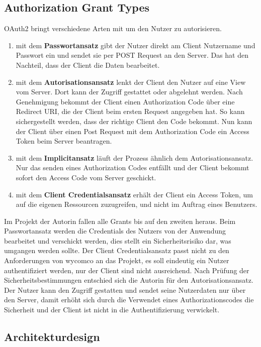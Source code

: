 \subsection{Authorization Grant Types}
\label{sec:AuthorizationGrants}

OAuth2 bringt verschiedene Arten mit um den Nutzer zu autorisieren.

\begin{enumerate}
\item mit dem \textbf{Passwortansatz} gibt der Nutzer direkt am Client Nutzername und Passwort ein und sendet sie per POST Request an den Server. Das hat den Nachteil, dass der Client die Daten bearbeitet.
\item mit dem \textbf{Autorisationsansatz} lenkt der Client den Nutzer auf eine View vom Server. Dort kann der Zugriff gestattet oder abgelehnt werden. Nach Genehmigung bekommt der Client einen Authorization Code über eine Redirect URI, die der Client beim ersten Request angegeben hat. So kann sichergestellt werden, dass der richtige Client den Code bekommt. Nun kann der Client über einen Post Request mit dem Authorization Code ein Access Token beim Server beantragen. 
\item mit dem \textbf{Implicitansatz} läuft der Prozess ähnlich dem Autorisationsansatz. Nur das senden eines Authorization Codes entfällt und der Client bekommt sofort den Access Code vom Server geschickt.
\item mit dem \textbf{Client Credentialsansatz} erhält der Client ein Access Token, um auf die eigenen Ressourcen zuzugreifen, und nicht im Auftrag eines Benutzers.
\end{enumerate}

Im Projekt der Autorin fallen alle Grants bis auf den zweiten heraus. Beim Passwortansatz werden die Credentials des Nutzers von der Anwendung bearbeitet und verschickt werden, dies stellt ein Sicherheitsrisiko dar, was umgangen werden sollte.
Der Client Credentialsansatz passt nicht zu den Anforderungen von wycomco an das Projekt, es soll eindeutig ein Nutzer authentifiziert werden, nur der Client sind nicht ausreichend. Nach Prüfung der Sicherheitsbestimmungen entschied sich die Autorin für den Autorisationsansatz. Der Nutzer kann den Zugriff gestatten und sendet seine Nutzerdaten nur über den Server, damit erhöht sich durch die Verwendet eines Authorizationscodes die Sicherheit und der Client ist nicht in die Authentifizierung verwickelt.

\subsection{Architekturdesign}
\label{sec:Architekturdesign}


